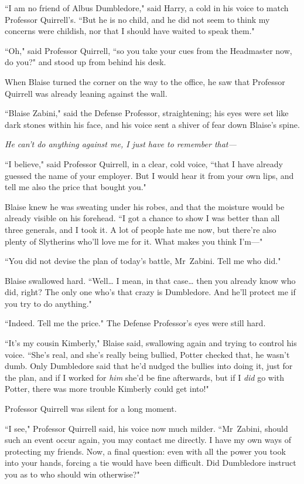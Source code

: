``I am no friend of Albus Dumbledore," said Harry, a cold in his voice to match Professor Quirrell's. ``But he is no child, and he did not seem to think my concerns were childish, nor that I should have waited to speak them."

``Oh," said Professor Quirrell, ``so you take your cues from the Headmaster now, do you?" and stood up from behind his desk.

\later

When Blaise turned the corner on the way to the office, he saw that Professor Quirrell was already leaning against the wall.

``Blaise Zabini," said the Defense Professor, straightening; his eyes were set like dark stones within his face, and his voice sent a shiver of fear down Blaise's spine.

\emph{He can't do anything against me, I just have to remember that—}

``I believe," said Professor Quirrell, in a clear, cold voice, ``that I have already guessed the name of your employer. But I would hear it from your own lips, and tell me also the price that bought you."

Blaise knew he was sweating under his robes, and that the moisture would be already visible on his forehead. ``I got a chance to show I was better than all three generals, and I took it. A lot of people hate me now, but there're also plenty of Slytherins who'll love me for it. What makes you think I'm—"

``You did not devise the plan of today's battle, Mr~Zabini. Tell me who did."

Blaise swallowed hard. ``Well{\ldots} I mean, in that case{\ldots} then you already know who did, right? The only one who's that crazy is Dumbledore. And he'll protect me if you try to do anything."

``Indeed. Tell me the price." The Defense Professor's eyes were still hard.

``It's my cousin Kimberly," Blaise said, swallowing again and trying to control his voice. ``She's real, and she's really being bullied, Potter checked that, he wasn't dumb. Only Dumbledore said that he'd nudged the bullies into doing it, just for the plan, and if I worked for \emph{him} she'd be fine afterwards, but if I \emph{did} go with Potter, there was more trouble Kimberly could get into!"

Professor Quirrell was silent for a long moment.

``I see," Professor Quirrell said, his voice now much milder. ``Mr~Zabini, should such an event occur again, you may contact me directly. I have my own ways of protecting my friends. Now, a final question: even with all the power you took into your hands, forcing a tie would have been difficult. Did Dumbledore instruct you as to who should win otherwise?"

